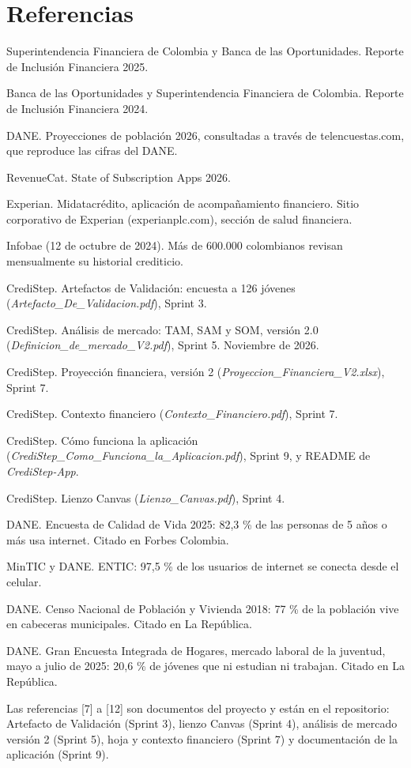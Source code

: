 \documentclass[11pt,a4paper]{article}
\begin{document}
\section{Referencias}

\begin{enumerate}[label={[\arabic*]},leftmargin=2em]
  \item Superintendencia Financiera de Colombia y Banca de las Oportunidades. Reporte de Inclusión Financiera 2025.
  \item Banca de las Oportunidades y Superintendencia Financiera de Colombia. Reporte de Inclusión Financiera 2024.
  \item DANE. Proyecciones de población 2026, consultadas a través de telencuestas.com, que reproduce las cifras del DANE.
  \item RevenueCat. State of Subscription Apps 2026.
  \item Experian. Midatacrédito, aplicación de acompañamiento financiero. Sitio corporativo de Experian (experianplc.com), sección de salud financiera.
  \item Infobae (12 de octubre de 2024). Más de 600.000 colombianos revisan mensualmente su historial crediticio.
  \item CrediStep. Artefactos de Validación: encuesta a 126 jóvenes (\textit{Artefacto\_De\_Validacion.pdf}), Sprint 3.
  \item CrediStep. Análisis de mercado: TAM, SAM y SOM, versión 2.0 (\textit{Definicion\_de\_mercado\_V2.pdf}), Sprint 5. Noviembre de 2026.
  \item CrediStep. Proyección financiera, versión 2 (\textit{Proyeccion\_Financiera\_V2.xlsx}), Sprint 7.
  \item CrediStep. Contexto financiero (\textit{Contexto\_Financiero.pdf}), Sprint 7.
  \item CrediStep. Cómo funciona la aplicación (\textit{CrediStep\_Como\_Funciona\_la\_Aplicacion.pdf}), Sprint 9, y README de \textit{CrediStep-App}.
  \item CrediStep. Lienzo Canvas (\textit{Lienzo\_Canvas.pdf}), Sprint 4.
  \item DANE. Encuesta de Calidad de Vida 2025: 82,3 \% de las personas de 5 años o más usa internet. Citado en Forbes Colombia.
  \item MinTIC y DANE. ENTIC: 97,5 \% de los usuarios de internet se conecta desde el celular.
  \item DANE. Censo Nacional de Población y Vivienda 2018: 77 \% de la población vive en cabeceras municipales. Citado en La República.
  \item DANE. Gran Encuesta Integrada de Hogares, mercado laboral de la juventud, mayo a julio de 2025: 20,6 \% de jóvenes que ni estudian ni trabajan. Citado en La República.
\end{enumerate}

Las referencias [7] a [12] son documentos del proyecto y están en el repositorio: Artefacto de Validación (Sprint 3), lienzo Canvas (Sprint 4), análisis de mercado versión 2 (Sprint 5), hoja y contexto financiero (Sprint 7) y documentación de la aplicación (Sprint 9).
\end{document}
